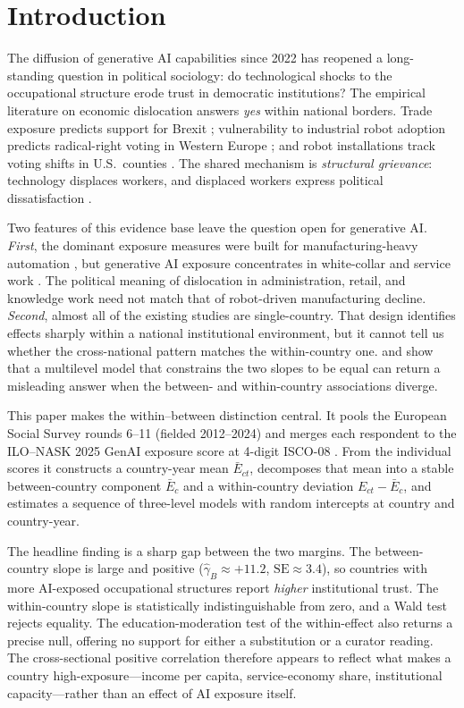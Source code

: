 \section{Introduction}

The diffusion of generative AI capabilities since 2022 has reopened a
long-standing question in political sociology: do technological shocks
to the occupational structure erode trust in democratic institutions?
The empirical literature on economic dislocation answers \emph{yes}
within national borders. Trade exposure predicts support for Brexit
\citep{ColantoneStanig2018}; vulnerability to industrial robot adoption
predicts radical-right voting in Western Europe
\citep{AnelliColantoneStanig2021}; and robot installations track voting
shifts in U.S.\ counties \citep{FreyBergerChen2018}. The shared mechanism
is \emph{structural grievance}: technology displaces workers, and
displaced workers express political dissatisfaction
\citep{GidronHall2017,Kurer2020}.

Two features of this evidence base leave the question open for
generative AI. \emph{First}, the dominant exposure measures were built
for manufacturing-heavy automation
\citep{Felten2021,Webb2020,AcemogluRestrepo2020}, but generative AI
exposure concentrates in white-collar and service work
\citep{Gmyrek2025}. The political meaning of dislocation in
administration, retail, and knowledge work need not match that of
robot-driven manufacturing decline. \emph{Second}, almost all of the
existing studies are single-country. That design identifies effects
sharply within a national institutional environment, but it cannot tell
us whether the cross-national pattern matches the within-country one.
\citet{BellJones2015} and \citet{SchmidtCatranFairbrother2016} show
that a multilevel model that constrains the two slopes to be equal can
return a misleading answer when the between- and within-country
associations diverge.

This paper makes the within--between distinction central. It pools the
European Social Survey rounds 6--11 (fielded 2012--2024) and merges
each respondent to the ILO--NASK 2025 GenAI exposure score at 4-digit
ISCO-08 \citep{Gmyrek2025}. From the individual scores it constructs a
country-year mean $\bar E_{ct}$, decomposes that mean into a stable
between-country component $\bar E_c$ and a within-country deviation
$E_{ct}-\bar E_c$, and estimates a sequence of three-level models with
random intercepts at country and country-year.

The headline finding is a sharp gap between the two margins. The
between-country slope is large and positive
($\hat\gamma_B \approx +11.2$, $\mathrm{SE}\approx 3.4$), so countries
with more AI-exposed occupational structures report \emph{higher}
institutional trust. The within-country slope is statistically
indistinguishable from zero, and a Wald test rejects equality.
The education-moderation test of the within-effect also returns a
precise null, offering no support for either a substitution or a curator
reading. The cross-sectional positive correlation therefore appears to
reflect what makes a country high-exposure---income per capita,
service-economy share, institutional capacity---rather than an effect
of AI exposure itself.

